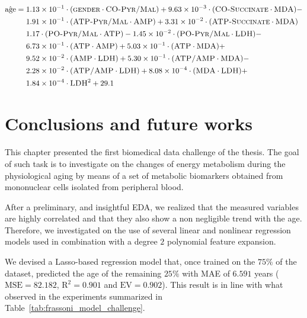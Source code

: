 \begin{equation}\label{eq:frassoni_lasso}
\begin{aligned}
\hat{\text{age}} = {} & 1.13 \times 10^{-1} \cdot (\text{\gender} \cdot \text{\copyrmal}) +
9.63 \times 10^{-3} \cdot (\text{\cosucc} \cdot \text{\mda}) - \\
& 1.91 \times 10^{-1} \cdot (\text{\atppyrmal} \cdot \text{\amp}) +
3.31 \times 10^{-2} \cdot (\text{\atpsucc} \cdot \text{\mda}) \\
& 1.17 \cdot (\text{\popyrmal} \cdot \text{\atp}) -
1.45 \times 10^{-2} \cdot (\text{\popyrmal} \cdot \text{\ldh}) -\\
& 6.73 \times 10^{-1} \cdot (\text{\atp} \cdot \text{\amp}) +
5.03 \times 10^{-1} \cdot (\text{\atp} \cdot \text{\mda}) +\\
& 9.52 \times 10^{-2} \cdot (\text{\amp} \cdot \text{\ldh}) +
5.30 \times 10^{-1} \cdot (\text{\atpamp} \cdot \text{\mda}) -\\
& 2.28 \times 10^{-2} \cdot (\text{\atpamp} \cdot \text{\ldh}) +
8.08 \times 10^{-4} \cdot (\text{\mda} \cdot \text{\ldh}) +\\
& 1.84 \times 10^{-4} \cdot \text{\ldh}^2 +
29.1
\end{aligned}
\end{equation}



\section{Conclusions and future works} \label{sec:frassoni_conclusions}
This chapter presented the first biomedical data challenge of the thesis. The goal of such task is to investigate on the changes of energy metabolism during the physiological aging by means of a set of metabolic biomarkers obtained from mononuclear cells isolated from peripheral blood.

After a preliminary, and insightful EDA, we realized that the measured variables are highly correlated and that they also show a non negligible trend with the age. Therefore, we investigated on the use of several linear and nonlinear regression models used in combination with a degree $2$ polynomial feature expansion.

We devised a Lasso-based regression model that, once trained on the $75\%$ of the dataset, predicted the age of the remaining $25\%$ with MAE of $6.591$ years ($\text{MSE}=82.182$, $\text{R}^2=0.901$ and $\text{EV}=0.902$). This result is in line with what observed in the experiments summarized in Table~\ref{tab:frassoni_model_challenge}.

